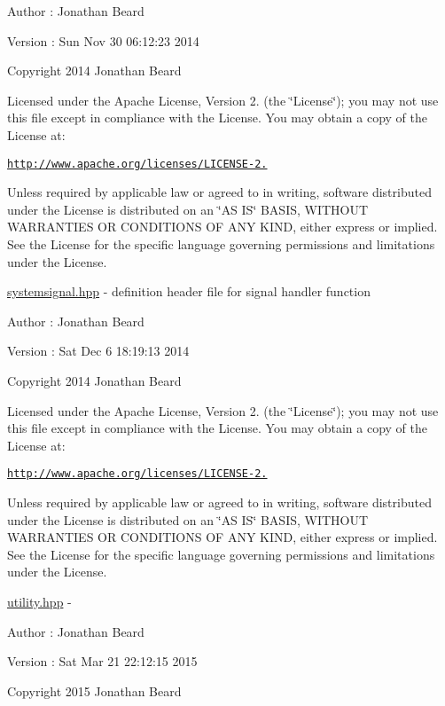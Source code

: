 \begin{DoxyAuthor}{Author}
\+: Jonathan Beard 
\end{DoxyAuthor}
\begin{DoxyVersion}{Version}
\+: Sun Nov 30 06\+:12\+:23 2014
\end{DoxyVersion}
Copyright 2014 Jonathan Beard

Licensed under the Apache License, Version 2. (the \char`\"{}\+License\char`\"{}); you may not use this file except in compliance with the License. You may obtain a copy of the License at\+:

\href{http://www.apache.org/licenses/LICENSE-2.0}{\tt http\+://www.\+apache.\+org/licenses/\+L\+I\+C\+E\+N\+S\+E-\/2.}

Unless required by applicable law or agreed to in writing, software distributed under the License is distributed on an \char`\"{}\+A\+S I\+S\char`\"{} B\+A\+S\+IS, W\+I\+T\+H\+O\+UT W\+A\+R\+R\+A\+N\+T\+I\+ES OR C\+O\+N\+D\+I\+T\+I\+O\+NS OF A\+NY K\+I\+ND, either express or implied. See the License for the specific language governing permissions and limitations under the License.

\hyperlink{systemsignal_8hpp_source}{systemsignal.\+hpp} -\/ definition header file for signal handler function

\begin{DoxyAuthor}{Author}
\+: Jonathan Beard 
\end{DoxyAuthor}
\begin{DoxyVersion}{Version}
\+: Sat Dec 6 18\+:19\+:13 2014
\end{DoxyVersion}
Copyright 2014 Jonathan Beard

Licensed under the Apache License, Version 2. (the \char`\"{}\+License\char`\"{}); you may not use this file except in compliance with the License. You may obtain a copy of the License at\+:

\href{http://www.apache.org/licenses/LICENSE-2.0}{\tt http\+://www.\+apache.\+org/licenses/\+L\+I\+C\+E\+N\+S\+E-\/2.}

Unless required by applicable law or agreed to in writing, software distributed under the License is distributed on an \char`\"{}\+A\+S I\+S\char`\"{} B\+A\+S\+IS, W\+I\+T\+H\+O\+UT W\+A\+R\+R\+A\+N\+T\+I\+ES OR C\+O\+N\+D\+I\+T\+I\+O\+NS OF A\+NY K\+I\+ND, either express or implied. See the License for the specific language governing permissions and limitations under the License.

\hyperlink{utility_8hpp_source}{utility.\+hpp} -\/ \begin{DoxyAuthor}{Author}
\+: Jonathan Beard 
\end{DoxyAuthor}
\begin{DoxyVersion}{Version}
\+: Sat Mar 21 22\+:12\+:15 2015
\end{DoxyVersion}
Copyright 2015 Jonathan Beard

